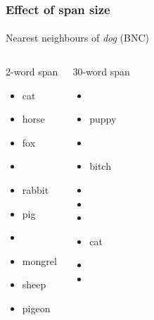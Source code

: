 \documentclass[t]{beamer} %
\begin{document}
\begin{frame}
  \frametitle{Effect of span size}
  \framesubtitle{}

  \centering
  Nearest neighbours of \emph{dog} (BNC)
  \ungap\footnotesize
  \begin{columns}[t]
    \column{4cm}
    \begin{block}{2-word span}
      \begin{itemize}
      \item cat
      \item horse
      \item fox
      \item {}
      \item rabbit
      \item pig
      \item {}
      \item mongrel
      \item sheep
      \item pigeon
      \end{itemize}
    \end{block}
    \column{4cm}
    \begin{block}{30-word span}
      \begin{itemize}
      \item {}
      \item puppy
      \item {}
      \item bitch
      \item {}
      \item {}
      \item {}
      \item cat
      \item {}
      \item {}
      \end{itemize}
    \end{block}
  \end{columns}

  \hfill{}
\end{frame}
\end{document}
